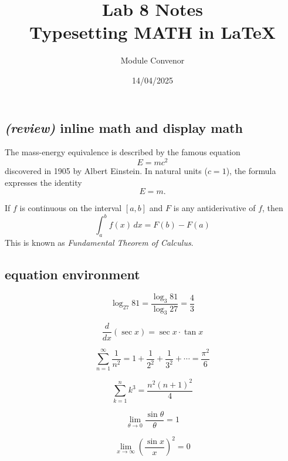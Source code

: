 \documentclass{article}
\title{Lab 8 Notes\\ {\small Typesetting MATH in \LaTeX}}
\author{Module Convenor}
\date{14/04/2025}
\begin{document}
\maketitle

\subsection{\textit{(review)} inline math and display math}


The mass-energy equivalence is described by the famous equation
\[ E=mc^2 \]
discovered in 1905 by Albert Einstein. In natural units ($c=1$), the formula expresses the identity
$$  E=m. $$


\noindent If $f$ is continuous on the interval $[a,b]$ and $F$ is any antiderivative of $f$, then
\[
\int _{a}^{b} f(x)\,dx =F(b)-F(a)
\]
This is known as \textit{Fundamental Theorem of Calculus}.



\subsection{equation environment}


\begin{equation}
\log_{27} 81=\frac{\log_3 81}{\log_3 27}=\frac{4}{3}
\end{equation}



\begin{equation}
\frac{d}{dx} (\sec x )= \sec x \cdot \tan x
\end{equation}

\begin{equation}
\sum_{n=1}^{\infty} \frac{1}{n^2}=1+\frac{1}{2^2}+\frac{1}{3^2}+\cdots =\frac{\pi^2}{6}
\end{equation}

\begin{equation*} %
\sum_{k=1}^{n} k^3=\frac{n^2(n+1)^2}{4}
\end{equation*}

\begin{equation}
\lim_{\theta \to 0} \frac{\sin\theta}{\theta} = 1
\end{equation}


\begin{equation*}
\lim_{x\to \infty} \left(\frac{\sin x}{x}\right)^2 = 0  %
\end{equation*}
\end{document}
